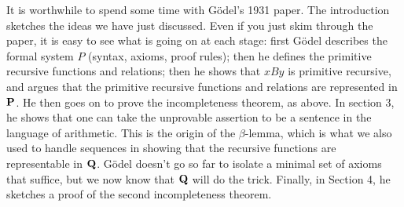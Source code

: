 \documentclass[../../include/open-logic-section]{subfiles}
\begin{document}


It is worthwhile to spend some time with G\"odel's 1931
paper. The introduction sketches the ideas we have just discussed.
Even if you just skim through the paper, it is easy to see what is
going on at each stage: first G\"odel describes the formal system $P$
(syntax, axioms, proof rules); then he defines the primitive recursive
functions and relations; then he shows that $x B y$ is primitive
recursive, and argues that the primitive recursive functions and
relations are represented in $\mathbf{P}$. He then goes on to prove the
incompleteness theorem, as above. In section 3, he shows that one can
take the unprovable assertion to be a sentence in the language of
arithmetic. This is the origin of the $\beta$-lemma, which is what we
also used to handle sequences in showing that the recursive functions
are representable in $\mathbf{Q}$. G\"odel doesn't go so far to isolate a
minimal set of axioms that suffice, but we now know that $\mathbf{Q}$ will do
the trick.  Finally, in Section 4, he sketches a proof of the second
incompleteness theorem.
\end{document}
